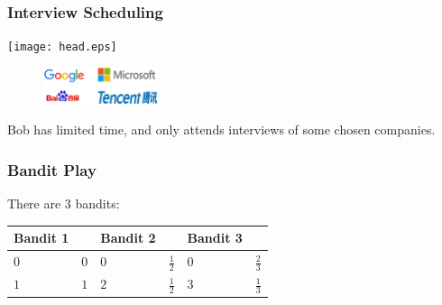\documentclass{beamer}
\begin{document}
\begin{frame}
\frametitle{Interview Scheduling}
\begin{spacing}{2.0}

\end{spacing}
\begin{multicols}{2}
    \centering
    \texttt{[image: head.eps]}%
    \begin{figure}
    \includegraphics[width=0.3\textwidth]{all.eps}
    \begin{spacing}{4.0}

    \end{spacing}
\end{figure}
\end{multicols}

Bob has limited time, and only attends interviews of some chosen companies.

\end{frame}

\begin{frame}
\frametitle{Bandit Play}

There are 3 bandits:\\
\begin{center}
\begin{tabular}{|ll|ll|ll|}
\hline
Bandit 1& & Bandit 2& &Bandit 3& \\
\hline
 $0$& $0$ &  $0$& $\frac{1}{2}$ & $0$& $\frac{2}{3}$\\
\hline
 $1$& $1$ &  $2$& $\frac{1}{2}$  & $3$& $\frac{1}{3}$\\
\hline
\end{tabular}
\end{center}

\end{frame}
\end{document}
